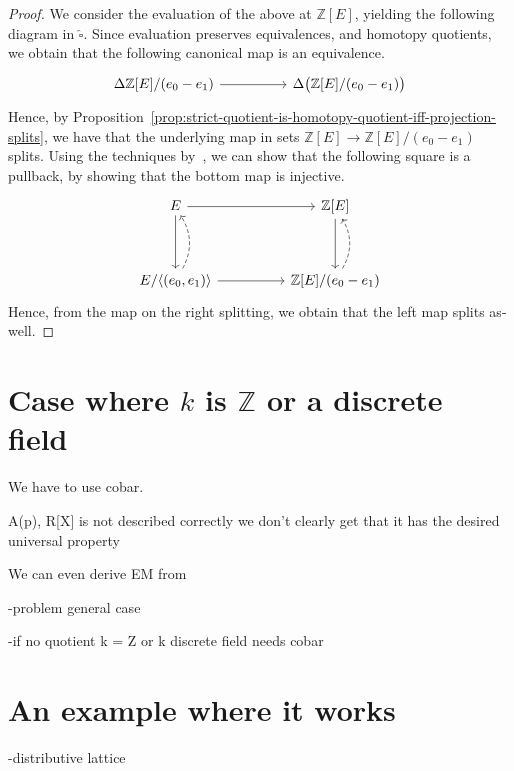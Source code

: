 \documentclass[10pt,a4paper]{article}
\newcommand{\ints}{\mathbb{Z}}
\DeclarePairedDelimiter\gen{\langle}{\rangle}
\DeclarePairedDelimiter\paren{(}{)}
\begin{document}
\begin{proof}
  We consider the evaluation of the above at $\ints[E]$, yielding the following diagram in $\widehat\square$.
  Since evaluation preserves equivalences, and homotopy quotients, we obtain that the following canonical map is an equivalence.
  \[\begin{tikzcd}
    \Delta\ints[E]/(e_0 - e_1) \arrow[rr] & & \Delta\paren[\big]{\ints[E]/(e_0 - e_1)}                            
  \end{tikzcd}\]
  Hence, by Proposition~\ref{prop:strict-quotient-is-homotopy-quotient-iff-projection-splits}, we have that the underlying map in sets $\ints[E] \to \ints[E]/(e_0 - e_1)$ splits. 
  Using the techniques by~\cite{mines}, we can show that the following square is a pullback, by showing that the bottom map is injective.
  \[\begin{tikzcd}
    E \arrow[dd] \arrow[rr]                                        &  & {\ints[E]} \arrow[dd]                                 \\
                                                                  &  &                                                       \\
    {E/\gen{(e_0, e_1)}} \arrow[rr] \arrow[uu, dashed, bend right] &  & {\ints[E]/(e_0 - e_1)} \arrow[uu, dashed, bend right]
  \end{tikzcd}\]
  Hence, from the map on the right splitting, we obtain that the left map splits as-well.
\end{proof}

\section{Case where $k$ is $\ints$ or a discrete field}

 We have to use cobar. %


A(p), R[X] is not described correctly
we don't clearly get that it has the desired universal property

We can even derive EM from


-problem general case

-if no quotient k = Z or k discrete field needs cobar


\section{An example where it works}

-distributive lattice




\end{document}
